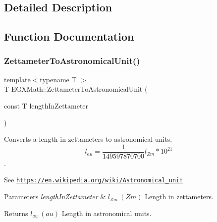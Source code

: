 \subsection{Detailed Description}


\subsection{Function Documentation}
\mbox{\label{group___e_g_x_math-_conversions-_length_conversions-_s_i-_zettameter-_astronomical_ga11b503418631f04db17ad979cef5403a}} 
\subsubsection{\texorpdfstring{Zettameter\+To\+Astronomical\+Unit()}{ZettameterToAstronomicalUnit()}}
{\footnotesize\ttfamily template$<$typename T $>$ \\
T E\+G\+X\+Math\+::\+Zettameter\+To\+Astronomical\+Unit (\begin{DoxyParamCaption}\item[{const T}]{length\+In\+Zettameter }\end{DoxyParamCaption})}



Converts a length in zettameters to astronomical units. \[ l_{au}= \frac{1}{149597870700} l_{Zm} * 10^{21} \]. 

See \href{https://en.wikipedia.org/wiki/Astronomical_unit}{\tt https\+://en.\+wikipedia.\+org/wiki/\+Astronomical\+\_\+unit} 
\begin{DoxyParams}{Parameters}
{\em length\+In\+Zettameter} & $ l_{Zm}\ (Zm)$ Length in zettameters. \\
\hline
\end{DoxyParams}
\begin{DoxyReturn}{Returns}
$ l_{au}\ (au)$ Length in astronomical units. 
\end{DoxyReturn}
\mbox{\label{group___e_g_x_math-_conversions-_length_conversions-_s_i-_zettameter-_astronomical_gacc76b416d7b6b3c4bd30cf8c5e924daf}} 
